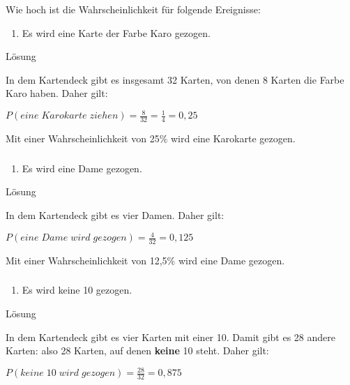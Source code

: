 \documentclass[
  ngerman,
]{book}
\providecommand{\tightlist}{%
  \setlength{\itemsep}{0pt}\setlength{\parskip}{0pt}}
\begin{document}
Wie hoch ist die Wahrscheinlichkeit für folgende Ereignisse:

\begin{enumerate}
\def\labelenumi{\alph{enumi})}
\tightlist
\item
  Es wird eine Karte der Farbe Karo gezogen.
\end{enumerate}

Lösung

In dem Kartendeck gibt es insgesamt 32 Karten, von denen 8 Karten die Farbe Karo haben. Daher gilt:

\(P(eine\;Karokarte\;ziehen)=\frac{8}{32}=\frac{1}{4}=0,25\)

Mit einer Wahrscheinlichkeit von 25\% wird eine Karokarte gezogen.

\hypertarget{section-94}{%
\subsubsection*{}\label{section-94}}

\begin{enumerate}
\def\labelenumi{\alph{enumi})}
\setcounter{enumi}{1}
\tightlist
\item
  Es wird eine Dame gezogen.
\end{enumerate}

Lösung

In dem Kartendeck gibt es vier Damen. Daher gilt:

\(P(eine\;Dame\;wird\;gezogen)=\frac{4}{32}=0,125\)

Mit einer Wahrscheinlichkeit von 12,5\% wird eine Dame gezogen.

\hypertarget{section-95}{%
\subsubsection*{}\label{section-95}}

\begin{enumerate}
\def\labelenumi{\alph{enumi})}
\setcounter{enumi}{2}
\tightlist
\item
  Es wird keine 10 gezogen.
\end{enumerate}

Lösung

In dem Kartendeck gibt es vier Karten mit einer 10. Damit gibt es 28 andere Karten: also 28 Karten, auf denen \textbf{keine} 10 steht. Daher gilt:

\(P(keine\;10\;wird\;gezogen)=\frac{28}{32}= 0,875\)
\end{document}

